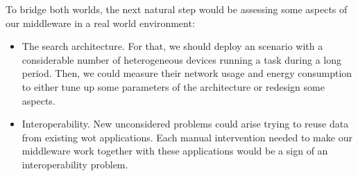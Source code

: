 To bridge both worlds, the next natural step would be assessing some aspects of our middleware in a real world environment: %
\begin{itemize}
  \item The search architecture.
        For that, we should deploy an scenario with a considerable number of heterogeneous devices running a task during a long period.
        Then, we could measure their network usage and energy consumption to either tune up some parameters of the architecture or redesign some aspects.
  \item Interoperability.
	New unconsidered problems could arise trying to reuse data from existing \ac{wot} applications.
	Each manual intervention needed to make our middleware work together with these applications would be a sign of an interoperability problem.
\end{itemize}